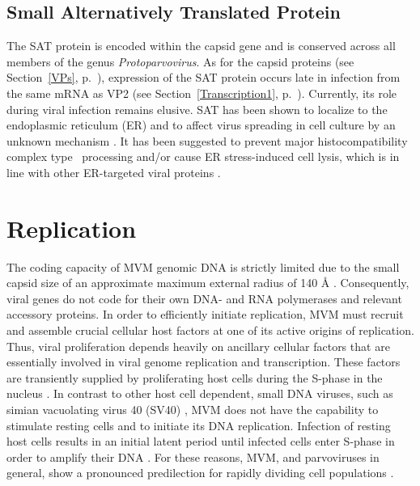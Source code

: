 

\subsection{Small Alternatively Translated Protein}
\label{SAT}
The SAT protein is encoded within the capsid gene and is conserved across all members of the genus \textit{Protoparvovirus}.  As for the capsid proteins (see Section~\ref{VPs}, p.~\pageref{VPs}), expression of the SAT protein occurs late in infection from the same mRNA as VP2 (see Section~\ref{Transcription1}, p.~\pageref{Transcription1}). Currently, its role during viral infection remains elusive. SAT has been shown to localize to the endoplasmic reticulum (ER) and to affect virus spreading in cell culture by an unknown mechanism \cite{pmid16189014}. It has been suggested to prevent major histocompatibility complex type~ processing \cite{pmid14671122, pmid14738766} and/or cause ER stress-induced cell lysis, which is in line with other ER-targeted viral proteins \cite{pmid14610184, pmid15708603, pmid11932381, pmid14960590}.
  



\section{Replication}
\label{Replication}
The coding capacity of MVM genomic DNA is strictly limited due to the small capsid size of an approximate maximum external radius of 140 \r{A} \cite{pmid15299974}. Consequently, viral genes do not code for their own DNA- and RNA polymerases and relevant accessory proteins. In order to efficiently initiate replication, MVM must recruit and assemble crucial cellular host factors at one of its active origins of replication. Thus, viral proliferation depends heavily on ancillary cellular factors that are essentially involved in viral genome replication and transcription. These factors are transiently supplied by proliferating host cells during the S-phase in the nucleus \cite{pmid16789120, pmid6602221, pmid3005655, pmid3296697, pmid9418888, pmid4673484, S-phase}. In contrast to other host cell dependent, small DNA viruses, such as simian vacuolating virus 40 (SV40) \cite{pmid4291013, pmid16578647}, MVM does not have the capability to stimulate resting cells and to initiate its DNA replication. Infection of resting host cells results in an initial latent period until infected cells enter S-phase in order to amplify their DNA \cite{pmid4673484, pmid3346950, pmid10792046}. For these reasons, MVM, and parvoviruses in general, show a pronounced predilection for rapidly dividing cell populations \cite{pmid3296697}. 

